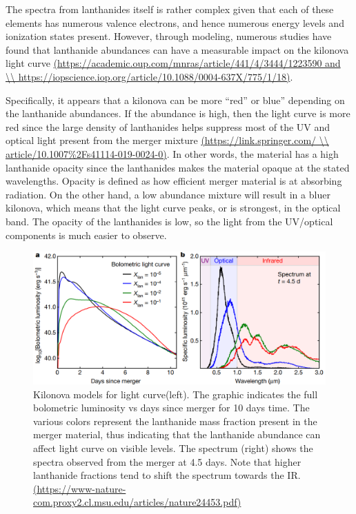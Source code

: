 \documentclass[11pt,a4paper]{article}
\begin{document}
The spectra from lanthanides itself is rather complex given that each of these elements has numerous valence electrons, and hence numerous energy levels and ionization states present. However, through modeling, numerous studies have found that lanthanide abundances can have a measurable impact on the kilonova light curve \url{(https://academic.oup.com/mnras/article/441/4/3444/1223590 and \\ https://iopscience.iop.org/article/10.1088/0004-637X/775/1/18)}.

Specifically, it appears that a kilonova can be more “red” or blue” depending on the lanthanide abundances. If the abundance is high, then the light curve is more red since the large density of lanthanides helps suppress most of the UV and optical light present from the merger mixture \url{(https://link.springer.com/ \\ article/10.1007\%2Fs41114-019-0024-0)}. In other words, the material has a high lanthanide opacity since the lanthanides makes the material opaque at the stated wavelengths. Opacity is defined as how efficient merger material is at absorbing radiation. On the other hand, a low abundance mixture will result in a bluer kilonova, which means that the light curve peaks, or is strongest, in the optical band. The opacity of the lanthanides is low, so the light from the UV/optical components is much easier to observe. 

\begin{figure}[h!]
  \includegraphics[width=1\textwidth]{kasen_curves.png}
  \caption{ Kilonova models for light curve(left). The graphic indicates the full bolometric luminosity vs days since merger for 10 days time. The various colors represent the lanthanide mass fraction present in the merger material, thus indicating that the lanthanide abundance can affect light curve on visible levels. The spectrum (right) shows the spectra observed from the merger at 4.5 days. Note that higher lanthanide fractions tend to shift the spectrum towards the IR. \url{(https://www-nature-com.proxy2.cl.msu.edu/articles/nature24453.pdf)} }
\end{figure}
\end{document}
